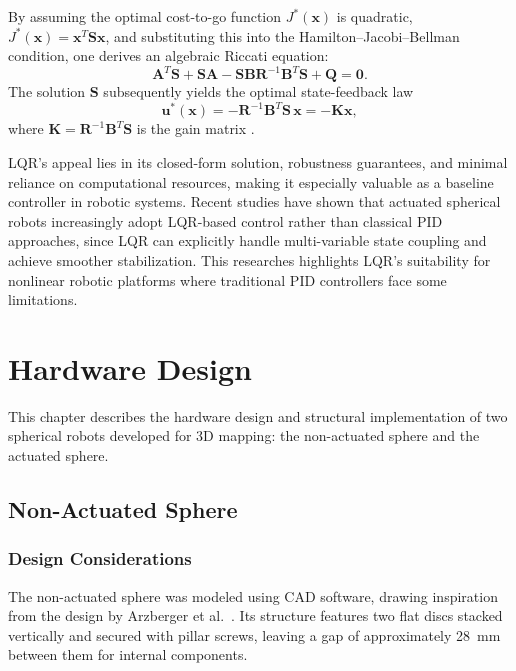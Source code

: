 \documentclass[english, bachelor, utf8]{base/thesis_telematics}
\begin{document}
By assuming the optimal cost-to-go function \(J^*(\mathbf{x})\) is quadratic, \(J^*(\mathbf{x}) = \mathbf{x}^T \mathbf{S} \mathbf{x}\), and substituting this into the Hamilton–Jacobi–Bellman condition, one derives an algebraic Riccati equation:
\[
\mathbf{A}^T \mathbf{S} + \mathbf{S} \mathbf{A} - \mathbf{S} \mathbf{B} \mathbf{R}^{-1} \mathbf{B}^T \mathbf{S} + \mathbf{Q} = \mathbf{0}.
\]
The solution \(\mathbf{S}\) subsequently yields the optimal state-feedback law
\[
\mathbf{u}^*(\mathbf{x}) = -\mathbf{R}^{-1} \mathbf{B}^T \mathbf{S} \, \mathbf{x} = -\mathbf{K} \mathbf{x},
\]
where \(\mathbf{K} = \mathbf{R}^{-1} \mathbf{B}^T \mathbf{S}\) is the gain matrix \cite{underactuatedLQR}.

LQR's appeal lies in its closed-form solution, robustness guarantees, and minimal reliance on computational resources, making it especially valuable as a baseline controller in robotic systems. Recent studies have shown that actuated spherical robots increasingly adopt LQR-based control rather than classical PID approaches, since LQR can explicitly handle multi-variable state coupling and achieve smoother stabilization. This researches highlights LQR’s suitability for nonlinear robotic platforms where traditional PID controllers face some limitations\cite{novelsphere}.



\chapter{Hardware Design}
\label{ch:hardwaredesign}

This chapter describes the hardware design and structural implementation of two spherical robots developed for 3D mapping: the non-actuated sphere and the actuated sphere.

\section{Non-Actuated Sphere}
\subsection{Design Considerations}

The non-actuated sphere was modeled using CAD software, drawing inspiration from the design by Arzberger et al.~\cite{Kalman_filter_sphere}.
Its structure features two flat discs stacked vertically and secured with pillar screws, leaving a gap of approximately \SI{28}{\milli\meter} between them for internal components. 
\end{document}
